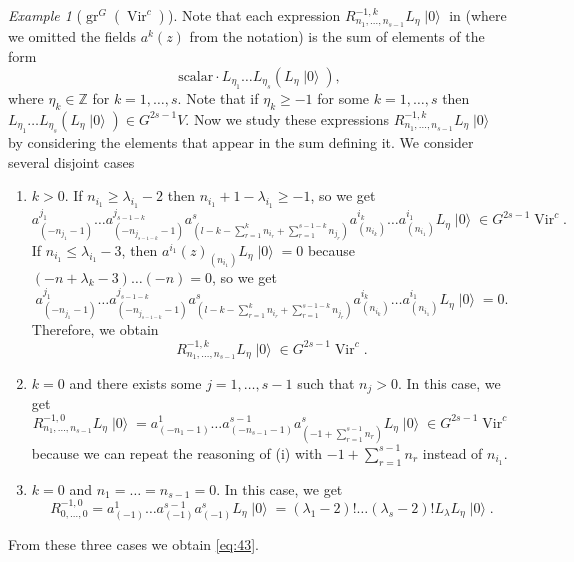 \documentclass[a4paper, 12pt, reqno]{amsart}
\theoremstyle{remark}
\newtheorem{example}[theorem]{Example}
\numberwithin{equation}{subsection}
\DeclareMathOperator{\Vir}{Vir}
\DeclareMathOperator{\gr}{gr}
\DeclareMathOperator{\vac}{|0\rangle}
\begin{document}
\begin{example}[$\gr^G(\Vir^c)$]
  Note that each expression $R^{-1, k}_{n_1, \dots, n_{s - 1}}L_{\eta}\vac$ in  (where we omitted the fields $a^k(z)$ from the notation) is the sum of elements of the form
  \begin{equation*}
    \text{scalar}\cdot L_{\eta_1}\dots L_{\eta_s}(L_{\eta}\vac),
  \end{equation*}
  where $\eta_k \in \mathbb{Z}$ for $k = 1, \dots, s$.
  Note that if $\eta_k \ge -1$ for some $k = 1, \dots, s$ then $L_{\eta_1}\dots L_{\eta_s}(L_{\eta}\vac) \in G^{2s - 1}V$.
  Now we study these expressions $R^{-1, k}_{n_1, \dots, n_{s - 1}}L_{\eta}\vac$ by considering the elements that appear in the sum defining it.
  We consider several disjoint cases
  \begin{enumerate}
  \item $k > 0$. If $n_{i_1} \ge \lambda_{i_1} - 2$ then $n_{i_1} + 1 - \lambda_{i_1} \ge -1$, so we get
    \begin{equation*}
      a^{j_1}_{(-n_{j_1} - 1)}\dots a^{j_{s - 1 - k}}_{(-n_{j_{s - 1 - k}} - 1)}a^s_{(l - k - \sum_{r = 1}^kn_{i_r} + \sum_{r = 1}^{s - 1 - k}n_{j_r})}a^{i_k}_{(n_{i_k})}\dots a^{i_1}_{(n_{i_1})}L_{\eta}\vac \in G^{2s - 1}\Vir^c.
    \end{equation*}
    If $n_{i_1} \le \lambda_{i_1} - 3$, then $a^{i_1}(z)_{(n_{i_1})}L_{\eta}\vac = 0$ because $(-n + \lambda_k - 3)\dots(-n) = 0$, so we get
    \begin{equation*}
      a^{j_1}_{(-n_{j_1} - 1)}\dots a^{j_{s - 1 - k}}_{(-n_{j_{s - 1 - k}} - 1)}a^s_{(l - k - \sum_{r = 1}^kn_{i_r} + \sum_{r = 1}^{s - 1 - k}n_{j_r})}a^{i_k}_{(n_{i_k})}\dots a^{i_1}_{(n_{i_1})}L_{\eta}\vac = 0.
    \end{equation*}
    Therefore, we obtain
    \begin{equation*}
      R^{-1, k}_{n_1, \dots, n_{s - 1}}L_{\eta}\vac \in G^{2s - 1}\Vir^c.
    \end{equation*}
  \item $k = 0$ and there exists some $j = 1, \dots, s - 1$ such that $n_j > 0$.
    In this case, we get
    \begin{equation*}
      R^{-1, 0}_{n_1, \dots, n_{s - 1}}L_{\eta}\vac = a^1_{(-n_1 - 1)}\dots a^{s - 1}_{(-n_{s - 1} - 1)}a^s_{(-1 + \sum_{r = 1}^{s - 1}n_r)}L_{\eta}\vac \in G^{2s - 1}\Vir^c
    \end{equation*}
    because we can repeat the reasoning of (i) with $-1 + \sum_{r = 1}^{s - 1}n_r$ instead of $n_{i_1}$.
  \item $k = 0$ and $n_1 = \dots = n_{s - 1} = 0$. In this case, we get
    \begin{equation*}
      R^{-1, 0}_{0, \dots, 0} = a^1_{(-1)}\dots a^{s - 1}_{(-1)}a^s_{(-1)} L_{\eta}\vac = (\lambda_1 - 2)!\dots(\lambda_s - 2)!L_{\lambda} L_{\eta}\vac.
    \end{equation*}
  \end{enumerate}
  From these three cases we obtain \eqref{eq:43}.


\end{example}
\end{document}

